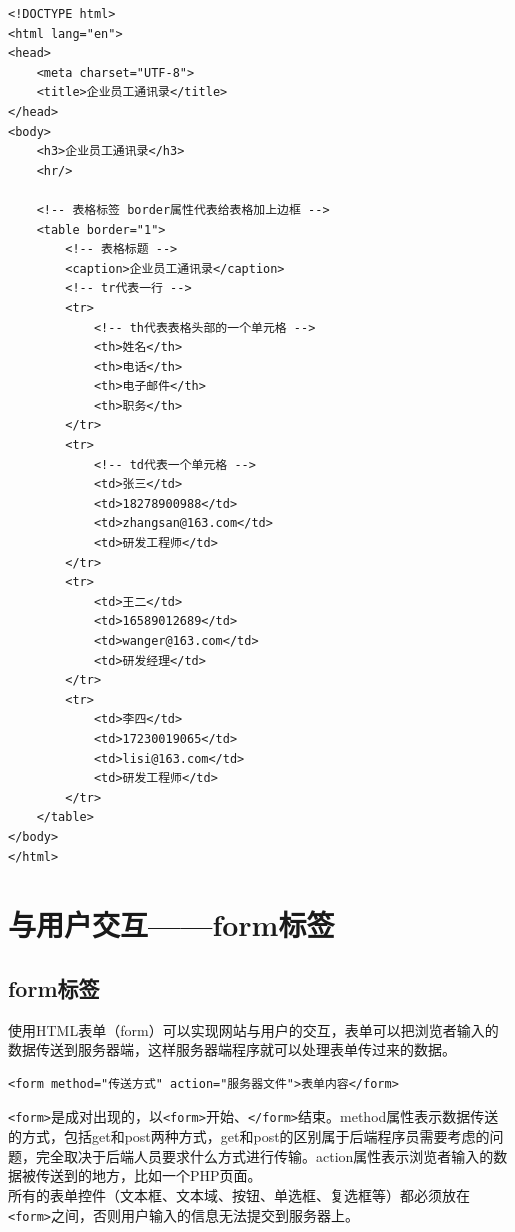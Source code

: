 \begin{lstlisting}[style=htmlcssjs, title=企业员工通讯录]
<!DOCTYPE html>
<html lang="en">
<head>
    <meta charset="UTF-8">
    <title>企业员工通讯录</title>
</head>
<body>
    <h3>企业员工通讯录</h3>
    <hr/>

    <!-- 表格标签 border属性代表给表格加上边框 -->
    <table border="1">
        <!-- 表格标题 -->
        <caption>企业员工通讯录</caption>
        <!-- tr代表一行 -->
        <tr>
            <!-- th代表表格头部的一个单元格 -->
            <th>姓名</th>
            <th>电话</th>
            <th>电子邮件</th>
            <th>职务</th>
        </tr>
        <tr>
            <!-- td代表一个单元格 -->
            <td>张三</td>
            <td>18278900988</td>
            <td>zhangsan@163.com</td>
            <td>研发工程师</td>
        </tr>
        <tr>
            <td>王二</td>
            <td>16589012689</td>
            <td>wanger@163.com</td>
            <td>研发经理</td>
        </tr>
        <tr>
            <td>李四</td>
            <td>17230019065</td>
            <td>lisi@163.com</td>
            <td>研发工程师</td>
        </tr>
    </table>
</body>
</html>
\end{lstlisting}

\newpage

\section{与用户交互——form标签}

\subsection{form标签}

使用HTML表单（form）可以实现网站与用户的交互，表单可以把浏览者输入的数据传送到服务器端，这样服务器端程序就可以处理表单传过来的数据。 \\

\begin{lstlisting}[style=htmlcssjs]
<form method="传送方式" action="服务器文件">表单内容</form>
\end{lstlisting}

\lstinline|<form>|是成对出现的，以\lstinline|<form>|开始、\lstinline|</form>|结束。method属性表示数据传送的方式，包括get和post两种方式，get和post的区别属于后端程序员需要考虑的问题，完全取决于后端人员要求什么方式进行传输。action属性表示浏览者输入的数据被传送到的地方，比如一个PHP页面。 \\

所有的表单控件（文本框、文本域、按钮、单选框、复选框等）都必须放在\lstinline|<form>|之间，否则用户输入的信息无法提交到服务器上。

